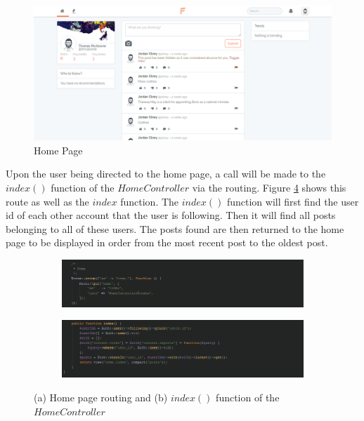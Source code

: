 \begin{figure}[H]
\centering
\includegraphics[width=\textwidth]{Images/Implementation/home_authorised}
\caption{Home Page}
\label{fig:HomeAuthorised}
\end{figure}

Upon the user being directed to the home page, a call will be made to the $index()$ function of the $HomeController$ via the routing. Figure \ref{fig:HomeRoutingController} shows this route as well as the $index$ function. The $index()$ function will first find the user id of each other account that the user is following. Then it will find all posts belonging to all of these users. The posts found are then returned to the home page to be displayed in order from the most recent post to the oldest post.

\begin{figure}[H]
\centering
\begin{subfigure}[b]{1\linewidth}
	\includegraphics[width=\textwidth]{Images/Implementation/HomeRouting}
	\caption{}
	\label{fig:HomeRouting}
\end{subfigure}
\begin{subfigure}[b]{1\linewidth}
	\includegraphics[width=1\textwidth]{Images/Implementation/HomeControllerIndexFunction}
	\caption{}
	\label{fig:HomeControllerIndexFunction}
\end{subfigure}
\caption{(a) Home page routing and (b) $index()$ function of the $HomeController$}
\label{fig:HomeRoutingController}
\end{figure}

